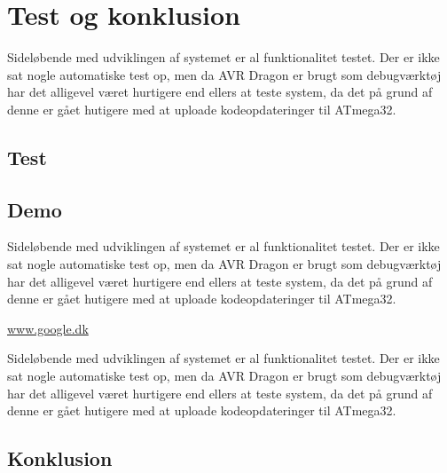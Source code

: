 \section{Test og konklusion}

Sideløbende med udviklingen af systemet er al funktionalitet testet. Der er ikke sat nogle automatiske test op, men da AVR Dragon er brugt som debugværktøj har det alligevel været hurtigere end ellers at teste system, da det på grund af denne er gået hutigere med at uploade kodeopdateringer til ATmega32.

\subsection{Test}


\subsection{Demo}
Sideløbende med udviklingen af systemet er al funktionalitet testet. Der er ikke sat nogle automatiske test op, men da AVR Dragon er brugt som debugværktøj har det alligevel været hurtigere end ellers at teste system, da det på grund af denne er gået hutigere med at uploade kodeopdateringer til ATmega32.

\vskip 0.5cm
	\centering
	\url{www.google.dk}
\vskip 0.5cm

Sideløbende med udviklingen af systemet er al funktionalitet testet. Der er ikke sat nogle automatiske test op, men da AVR Dragon er brugt som debugværktøj har det alligevel været hurtigere end ellers at teste system, da det på grund af denne er gået hutigere med at uploade kodeopdateringer til ATmega32.

\subsection{Konklusion}

